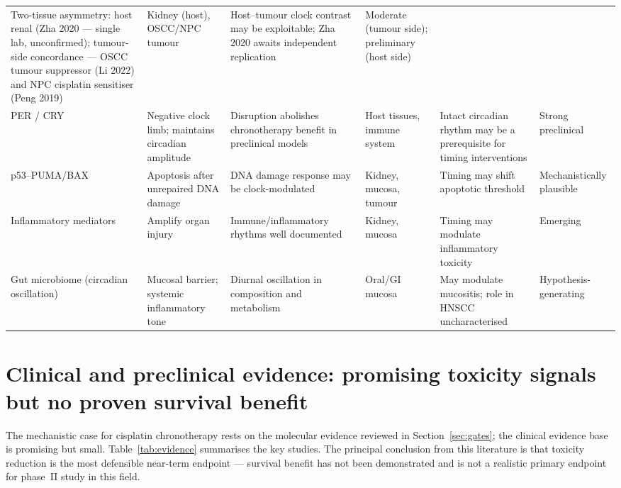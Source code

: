 \documentclass[preprint,review,12pt]{elsarticle}
\renewcommand{\arraystretch}{1.18}
\newenvironment{compactsidewaystable}
  {\begin{table}\centering\scriptsize
   \setlength{\tabcolsep}{3pt}\renewcommand{\arraystretch}{1.08}}
  {\end{table}}
\begin{document}
\begin{compactsidewaystable}
\begin{tabularx}{0.95\textheight}{L{2.4cm} Y Y L{2.2cm} Y L{2.2cm}}
  Two-tissue asymmetry: host renal
  (Zha 2020 --- single lab, unconfirmed); tumour-side concordance --- OSCC tumour suppressor (Li 2022) and NPC cisplatin sensitiser (Peng 2019) &
  Kidney (host), OSCC/NPC tumour &
  Host--tumour clock contrast may be exploitable; Zha 2020 awaits
  independent replication &
  Moderate (tumour side); preliminary (host side) \\
\addlinespace
PER / CRY &
  Negative clock limb; maintains circadian amplitude &
  Disruption abolishes chronotherapy benefit in preclinical models &
  Host tissues, immune system &
  Intact circadian rhythm may be a prerequisite for timing interventions &
  Strong preclinical \\
\addlinespace
p53--PUMA/BAX &
  Apoptosis after unrepaired DNA damage &
  DNA damage response may be clock-modulated &
  Kidney, mucosa, tumour &
  Timing may shift apoptotic threshold &
  Mechanistically plausible \\
\addlinespace
Inflammatory mediators &
  Amplify organ injury &
  Immune/inflammatory rhythms well documented &
  Kidney, mucosa &
  Timing may modulate inflammatory toxicity &
  Emerging \\
\addlinespace
Gut microbiome
  (circadian oscillation) &
  Mucosal barrier; systemic inflammatory tone &
  Diurnal oscillation in composition and metabolism~\cite{Thaiss2014} &
  Oral/GI mucosa &
  May modulate mucositis; role in HNSCC uncharacterised &
  Hypothesis-generating \\
\bottomrule
\end{tabularx}
\end{compactsidewaystable}


\section{Clinical and preclinical evidence: promising toxicity signals but
  no proven survival benefit}
\label{sec:evidence}


The mechanistic case for cisplatin chronotherapy rests on the molecular
evidence reviewed in Section~\ref{sec:gates}; the clinical evidence base
is promising but small.  Table~\ref{tab:evidence} summarises the key
studies.  The principal conclusion from this literature is that
toxicity reduction is the most defensible near-term endpoint --- survival benefit has not been demonstrated and is not a realistic
primary endpoint for phase~II study in this field.
\end{document}
